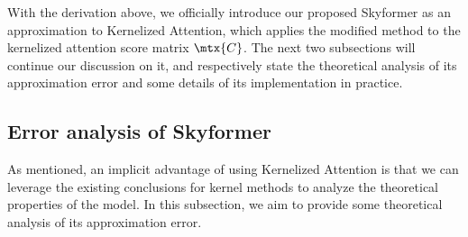 With the derivation above, we officially introduce our proposed Skyformer as an approximation to Kernelized Attention, which applies the modified \nystrom method to the kernelized attention score matrix $\mtx{C}$.
The next two subsections will continue our discussion on it, and respectively state the theoretical analysis of its approximation error and some details of its implementation in practice.


\subsection{Error analysis of Skyformer}


As mentioned, an implicit advantage of using Kernelized Attention is that we can leverage the existing conclusions for kernel methods to analyze the theoretical properties of the model.
In this subsection, we aim to provide some theoretical analysis of its approximation error.

